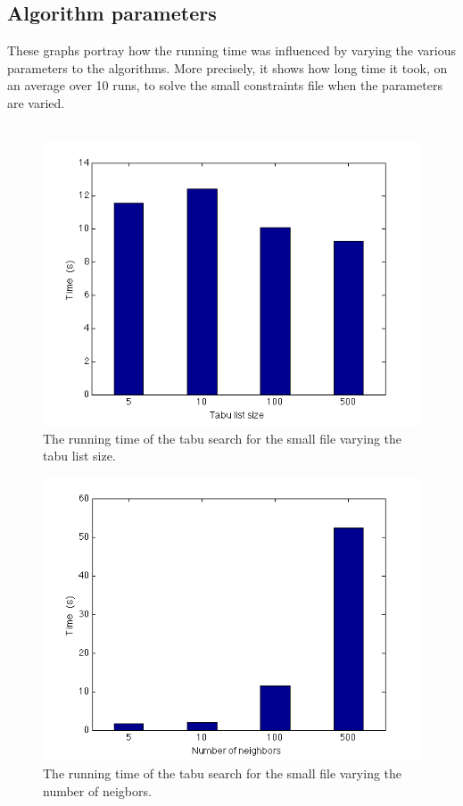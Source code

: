 \documentclass[titlepage,a4paper]{article}
\begin{document}
\pagebreak
\subsection{Algorithm parameters}
These graphs portray how the running time was influenced by varying the various parameters to the algorithms. More precisely, it shows how long time it took, on an average over 10 runs, to solve the small constraints file when the parameters are varied. \\\\
\begin{figure}[H]
  \begin{center}
    \includegraphics[scale=0.5]{../results/figures/tabu_list_size.png}
  \end{center}
  \caption{The running time of the tabu search for the small file varying the tabu list size.}
  \label{tabu_list_size}
\end{figure}

\begin{figure}[H]
  \begin{center}
    \includegraphics[scale=0.5]{../results/figures/tabu_neighbor.png}
  \end{center}
  \caption{The running time of the tabu search for the small file varying the number of neigbors.}
  \label{tabu_neighbor}
\end{figure}
\end{document}
